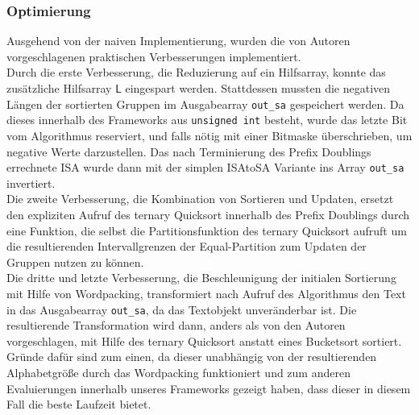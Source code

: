 \subsubsection{Optimierung}
Ausgehend von der naiven Implementierung, wurden die von Autoren vorgeschlagenen praktischen Verbesserungen implementiert. \\
Durch die erste Verbesserung, die Reduzierung auf ein Hilfsarray, konnte das zusätzliche Hilfsarray $\mathsf{L}$ eingespart werden. Stattdessen mussten die negativen Längen der sortierten Gruppen im Ausgabearray \texttt{out_sa} gespeichert werden. Da dieses innerhalb des Frameworks aus \texttt{unsigned int} besteht, wurde das letzte Bit vom Algorithmus reserviert, und falls nötig mit einer Bitmaske überschrieben, um \glqq negative\grqq{} Werte darzustellen. Das nach Terminierung des Prefix Doublings errechnete ISA wurde dann mit der simplen ISAtoSA Variante ins Array \texttt{out_sa} invertiert. \\
Die zweite Verbesserung, die Kombination von Sortieren und Updaten, ersetzt den expliziten Aufruf des ternary Quicksort innerhalb des Prefix Doublings durch eine Funktion, die selbst die Partitionsfunktion des ternary Quicksort aufruft um die resultierenden Intervallgrenzen der Equal-Partition zum Updaten der Gruppen nutzen zu können.\\
Die dritte und letzte Verbesserung, die Beschleunigung der initialen Sortierung mit Hilfe von Wordpacking, transformiert nach Aufruf des Algorithmus den Text in das Ausgabearray \texttt{out_sa}, da das Textobjekt unveränderbar ist. Die resultierende Transformation wird dann, anders als von den Autoren vorgeschlagen, mit Hilfe des ternary Quicksort anstatt eines Bucketsort sortiert. Gründe dafür sind zum einen, da dieser unabhängig von der resultierenden Alphabetgröße durch das Wordpacking funktioniert und zum anderen Evaluierungen innerhalb unseres Frameworks gezeigt haben, dass dieser in diesem Fall die beste Laufzeit bietet.
